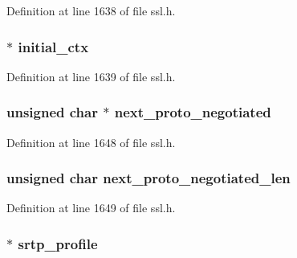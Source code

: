 Definition at line 1638 of file ssl.\+h.

\subsubsection[{\texorpdfstring{initial\+\_\+ctx}{initial_ctx}}]{ $\ast$ initial\+\_\+ctx}\hypertarget{structssl__st_a60b05fcdf0e0ca5b4e3db0330849efbb}{}\label{structssl__st_a60b05fcdf0e0ca5b4e3db0330849efbb}


Definition at line 1639 of file ssl.\+h.

\subsubsection[{\texorpdfstring{next\+\_\+proto\+\_\+negotiated}{next_proto_negotiated}}]{\setlength{\rightskip}{0pt plus 5cm}unsigned char $\ast$ next\+\_\+proto\+\_\+negotiated}\hypertarget{structssl__st_a566878646e012f8be2f5c38db4137638}{}\label{structssl__st_a566878646e012f8be2f5c38db4137638}


Definition at line 1648 of file ssl.\+h.

\subsubsection[{\texorpdfstring{next\+\_\+proto\+\_\+negotiated\+\_\+len}{next_proto_negotiated_len}}]{\setlength{\rightskip}{0pt plus 5cm}unsigned char next\+\_\+proto\+\_\+negotiated\+\_\+len}\hypertarget{structssl__st_a9a74ebef7862211bb268b1d2b944a9b7}{}\label{structssl__st_a9a74ebef7862211bb268b1d2b944a9b7}


Definition at line 1649 of file ssl.\+h.

\subsubsection[{\texorpdfstring{srtp\+\_\+profile}{srtp_profile}}]{ $\ast$ srtp\+\_\+profile}\hypertarget{structssl__st_a43d86efb97ae5e83204ea6362f97ad8d}{}\label{structssl__st_a43d86efb97ae5e83204ea6362f97ad8d}


